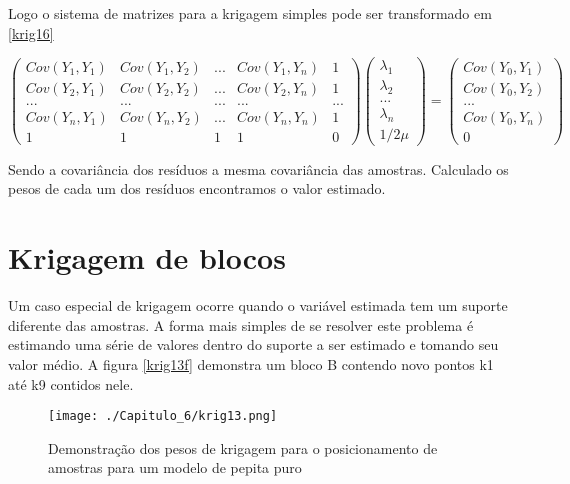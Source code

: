 Logo o sistema de matrizes para  a krigagem simples pode ser transformado em \eqref{krig16}

\begin{equation}\label{krig16}
\begin{pmatrix}
Cov(Y_{1},Y_{1})&Cov(Y_{1},Y_{2})& ... & Cov(Y_{1},Y_{n})& 1\\ 
Cov(Y_{2},Y_{1})&Cov(Y_{2},Y_{2})& ... & Cov(Y_{2},Y_{n})& 1 \\ 
...&...& ...&... & ...\\
Cov(Y_{n},Y_{1})&Cov(Y_{n},Y_{2})& ... & Cov(Y_{n},Y_{n})& 1\\
1&1& 1&1& 0
\end{pmatrix} 
\begin{pmatrix}
\lambda _{1}\\ 
\lambda _{2}\\ 
...\\ 
\lambda _{n}\\
1/2\mu
\end{pmatrix}=\begin{pmatrix}
Cov(Y_{0}, Y_{1})\\ 
Cov(Y_{0}, Y_{2})\\  
...\\
Cov(Y_{0}, Y_{n})\\
0
\end{pmatrix}
\end{equation}

Sendo a covariância dos resíduos a mesma covariância das amostras. Calculado os pesos de cada um dos resíduos encontramos o valor estimado.

\section{Krigagem de blocos}

Um caso especial de krigagem ocorre quando o variável estimada tem um suporte diferente das amostras. A forma mais simples de se resolver este problema é estimando uma série de valores dentro do suporte a ser estimado e tomando seu valor médio. A figura \eqref{krig13f} demonstra um bloco B contendo novo pontos k1 até k9 contidos nele. 

\begin{figure}[H]
	\centering
	\texttt{[image: ./Capitulo\_6/krig13.png]}
	\caption{Demonstração dos pesos de krigagem para o posicionamento de amostras para um modelo de pepita puro}
	\label{krig13f}
\end{figure}

